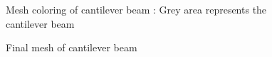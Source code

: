     \begin{figure}
        \centering
        \caption[Mesh coloring of cantilever beam]{Mesh coloring of cantilever beam : Grey area represents the cantilever beam}
        \label{qdt_fig:ex_cantilever_beam_mesh_coloring}
    \end{figure}

    \begin{figure}
        \centering
        \caption[Final mesh of cantilever beam]{Final mesh of cantilever beam}
        \label{qdt_fig:ex_cantilever_beam_mesh_final}
    \end{figure}
